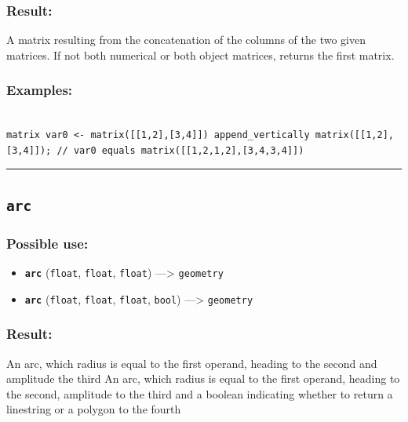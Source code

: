 \documentclass[]{book}
\providecommand{\tightlist}{%
  \setlength{\itemsep}{0pt}\setlength{\parskip}{0pt}}
\theoremstyle{definition}
\theoremstyle{definition}
\theoremstyle{definition}
\theoremstyle{remark}
\begin{document}
\subsubsection{Result:}\label{result-39}

A matrix resulting from the concatenation of the columns of the two
given matrices. If not both numerical or both object matrices, returns
the first matrix.

\subsubsection{Examples:}\label{examples-32}

\begin{verbatim}
 
matrix var0 <- matrix([[1,2],[3,4]]) append_vertically matrix([[1,2],[3,4]]); // var0 equals matrix([[1,2,1,2],[3,4,3,4]])
\end{verbatim}

\begin{center}\rule{0.5\linewidth}{\linethickness}\end{center}

\subsection{\texorpdfstring{\texttt{arc}}{arc}}\label{arc}

\subsubsection{Possible use:}\label{possible-use-41}

\begin{itemize}
\tightlist
\item
  \textbf{\texttt{arc}} (\texttt{float}, \texttt{float}, \texttt{float})
  ---\textgreater{} \texttt{geometry}
\item
  \textbf{\texttt{arc}} (\texttt{float}, \texttt{float}, \texttt{float},
  \texttt{bool}) ---\textgreater{} \texttt{geometry}
\end{itemize}

\subsubsection{Result:}\label{result-40}

An arc, which radius is equal to the first operand, heading to the
second and amplitude the third An arc, which radius is equal to the
first operand, heading to the second, amplitude to the third and a
boolean indicating whether to return a linestring or a polygon to the
fourth
\end{document}
